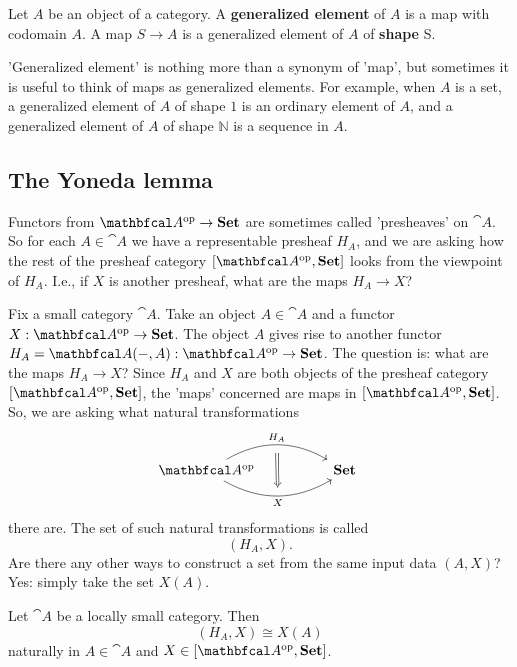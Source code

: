 \begin{definition}
    Let $A$ be an object of a category. A \textbf{generalized element} of $A$ is a map with codomain $A$. A map $S\to A$ is a generalized element of $A$ of \textbf{shape} S.
\end{definition}
'Generalized element' is nothing more than a synonym of 'map', but sometimes it is useful to think of maps as generalized elements. For example, when $A$ is a set, a generalized element of $A$ of shape $1$ is an ordinary element of $A$, and a generalized element of $A$ of shape $\mathbb{N}$ is a sequence in $A$.

\subsection{The Yoneda lemma}
Functors from $\catop{A}\to\bcat{Set}$ are sometimes called 'presheaves' on $\cat{A}$. So for each $A\in\cat{A}$ we have a representable presheaf $H_A$, and we are asking how the rest of the presheaf category $[\catop{A},\bcat{Set}]$ looks from the viewpoint of $H_A$. I.e., if $X$ is another presheaf, what are the maps $H_A\to X$?\par

Fix a small category $\cat{A}$. Take an object $A\in\cat{A}$ and a functor $X:\catop{A}\to\bcat{Set}$. The object $A$ gives rise to another functor $H_A=\cat{A}(-,A):\catop{A}\to\bcat{Set}$. The question is: what are the maps $H_A\to X$? Since $H_A$ and $X$ are both objects of the presheaf category $[\catop{A}, \bcat{Set}]$, the 'maps' concerned are maps in $[\catop{A},\bcat{Set}]$. So, we are asking what natural transformations
\begin{equation*}
\begin{tikzcd}
    \catop{A}
    \arrow[rr, bend left=30, "H_A"{name=t}]
    \arrow[rr, bend right=30, "X"'{name=b}]
    && \bcat{Set} \
    \arrow[from=t, Rightarrow, to=b, shorten <= 6pt, shorten >= 6pt]
\end{tikzcd}
\end{equation*}
there are. The set of such natural transformations is called
\begin{equation*}
    [\catop{A},\bcat{Set}](H_A,X).
\end{equation*}
Are there any other ways to construct a set from the same input data $(A,X)$? Yes: simply take the set $X(A)$.

\begin{theorem}[Yoneda]
    Let $\cat{A}$ be a locally small category. Then
    \begin{equation}
        [\catop{A},\bcat{Set}](H_A,X)\cong X(A)
    \end{equation}
    naturally in $A\in\cat{A}$ and $X\in [\catop{A},\bcat{Set}]$.
\end{theorem}


